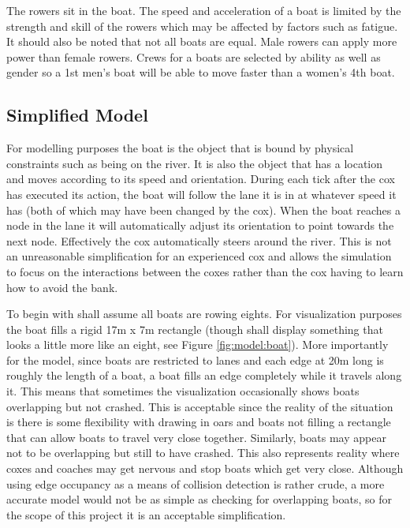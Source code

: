       The rowers sit in the boat. The speed and acceleration of a boat
      is limited by the strength and skill of the rowers which may be affected by factors such as fatigue. It should also be noted that
      not all boats are equal. Male rowers can apply more power than female
      rowers. Crews for a boats are selected by ability as well as gender so a 1st men's boat will
      be able to move faster than a women's 4th boat.
      
      \subsection{Simplified Model}
      For modelling purposes the boat is the object that is bound by physical constraints such as being on the river. It is also the object that has a location and moves according to its speed and orientation. During each tick after the cox has executed its action, the boat will follow the lane it is in at whatever speed it has (both of which may have been changed by the cox). When the boat reaches a node in the lane it will automatically adjust its orientation to point towards the next node. Effectively the cox automatically steers around the river. This is not an unreasonable simplification for an experienced cox and allows the simulation to focus on the interactions between the coxes rather than the cox having to learn how to avoid the bank.
      
      To begin with shall assume all boats are rowing eights. For visualization purposes the boat fills a rigid 17m x 7m rectangle (though shall display something that looks a little more like an eight, see Figure \ref{fig:model:boat}). More importantly for the model, since boats are restricted to lanes and each edge at 20m long is roughly the length of a boat, a boat fills an edge completely while it travels along it. This means that sometimes the visualization occasionally shows boats overlapping but not crashed. This is acceptable since the reality of the situation is there is some flexibility with drawing in oars and boats not filling a rectangle that can allow boats to travel very close together. Similarly, boats may appear not to be overlapping but still to have crashed. This also represents reality where coxes and coaches may get nervous and stop boats which get very close. Although using edge occupancy as a means of collision detection is rather crude, a more accurate model would not be as simple as checking for overlapping boats, so for the scope of this project it is an acceptable simplification.
      
